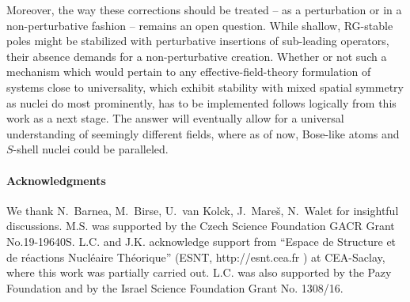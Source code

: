 \documentclass[preprint,12pt]{elsarticle}
\begin{document}
{Moreover, the way these corrections should be treated -- as a perturbation or in a non-perturbative fashion -- remains an open question.
While shallow, RG-stable poles might be stabilized with perturbative insertions of sub-leading operators, their absence demands for a
non-perturbative creation.
Whether or not such a mechanism which would pertain to any effective-field-theory formulation of systems close to universality,
which exhibit stability with mixed spatial symmetry as nuclei do most prominently, has to be implemented follows logically from
this work as a next stage. The answer will eventually allow for a universal understanding of seemingly different fields, where as of now,
Bose-like atoms and $S$-shell nuclei could be paralleled.}

\paragraph*{Acknowledgments}
We thank N.~Barnea,  M.~Birse, U.~van Kolck, J.~Mare\v{s}, N.~Walet for insightful
discussions.
M.S. was supported by the Czech Science Foundation GACR Grant No.19-19640S.
L.C. and J.K. acknowledge support from ``Espace de Structure et de r\'eactions
Nucl\'eaire Th\'eorique''  (ESNT, http://esnt.cea.fr )  at CEA-Saclay, where this work
was partially carried out.
L.C. was also supported by the Pazy Foundation and by the
Israel Science Foundation Grant No. 1308/16.






\end{document}
